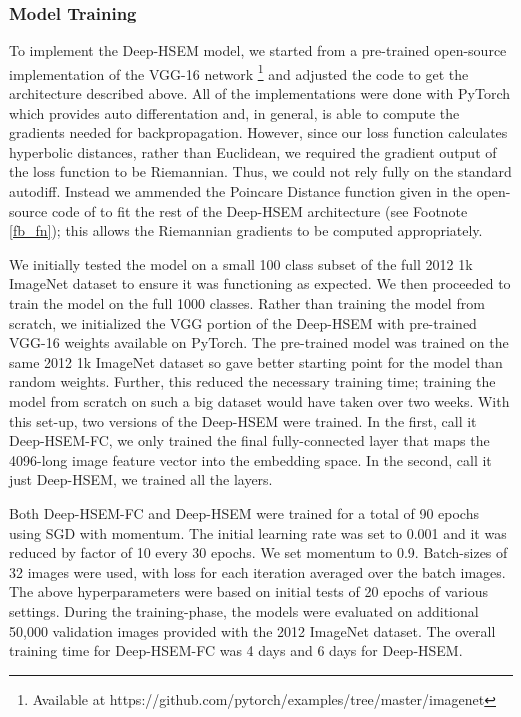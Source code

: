 \documentclass[12pt]{report}
\begin{document}
\subsubsection{Model Training}
To implement the Deep-HSEM model, we started from a pre-trained open-source implementation of the VGG-16 network \footnote{Available at https://github.com/pytorch/examples/tree/master/imagenet} and adjusted the code to get the architecture described above. All of the implementations were done with PyTorch \cite{Paszke2017} which provides auto differentation and, in general, is able to compute the gradients needed for backpropagation. However, since our loss function calculates hyperbolic distances, rather than Euclidean, we required the gradient output of the loss function to be Riemannian. Thus, we could not rely fully on the standard autodiff. Instead we ammended the Poincare Distance function given in the open-source code of \cite{Nickel2017} to fit the rest of the Deep-HSEM architecture (see Footnote \ref{fb_fn}); this allows the Riemannian gradients to be computed appropriately.

We initially tested the model on a small 100 class subset of the full 2012 1k ImageNet dataset to ensure it was functioning as expected. We then proceeded to train the model on the full 1000 classes. Rather than training the model from scratch, we initialized the VGG portion of the Deep-HSEM with pre-trained VGG-16 weights available on PyTorch. The pre-trained model was trained on the same 2012 1k ImageNet dataset so gave better starting point for the model than random weights. Further, this reduced the necessary training time; training the model from scratch on such a big dataset would have taken over two weeks. With this set-up, two versions of the Deep-HSEM were trained. In the first, call it Deep-HSEM-FC, we only trained the final fully-connected layer that maps the 4096-long image feature vector into the embedding space. In the second, call it just Deep-HSEM, we trained all the layers.

Both Deep-HSEM-FC and Deep-HSEM were trained for a total of 90 epochs using SGD with momentum. The initial learning rate was set to 0.001 and it was reduced by factor of 10 every 30 epochs. We set momentum to 0.9. Batch-sizes of 32 images were used, with loss for each iteration averaged over the batch images. The above hyperparameters were based on initial tests of 20 epochs of various settings. During the training-phase, the models were evaluated on additional 50,000 validation images provided with the 2012 ImageNet dataset. The overall training time for Deep-HSEM-FC was 4 days and 6 days for Deep-HSEM.
\end{document}
